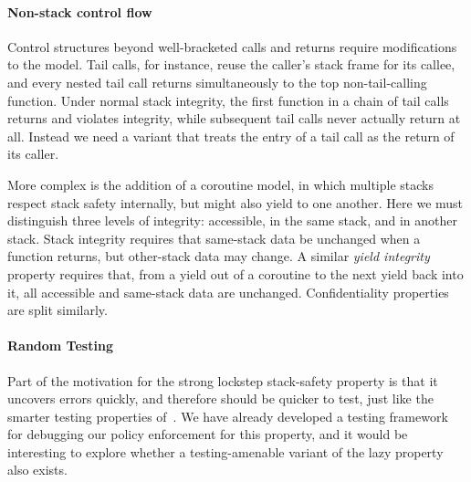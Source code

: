 \documentclass[acmsmall,review,anonymous]{acmart}\settopmatter{printfolios=true,printccs=false,printacmref=false}
\begin{document}
{{  \paragraph{Non-stack control flow}

    Control structures beyond well-bracketed calls and returns require
    modifications to the model. Tail calls, for instance, reuse the caller's
    stack frame for its callee, and every nested tail call returns
    simultaneously to the top non-tail-calling function. Under normal stack
    integrity, the first function in a chain of tail calls returns and violates
    integrity, while subsequent tail calls never actually return at all.
    Instead we need a variant that treats the entry of a tail call as the
    return of its caller.

    More complex is the addition of a coroutine model, in which multiple stacks
    respect stack safety internally, but might also yield to one another.
    Here we must distinguish three levels of integrity: accessible, in the same
    stack, and in another stack. Stack integrity requires that same-stack data
    be unchanged when a function returns, but other-stack data may change. A
    similar {\em yield integrity} property requires that, from a yield out of
    a coroutine to the next yield back into it, all accessible and same-stack
    data are unchanged. Confidentiality properties are split similarly.

  \paragraph{Random Testing}

  Part of the motivation for the strong lockstep stack-safety property
  is that it uncovers errors quickly, and therefore should be quicker
  to test, just like the smarter testing properties
  of~\citet{TestingNI:ICFP}. We have already developed a testing
  framework for debugging our policy enforcement for this property, and
  it would be interesting to explore whether a testing-amenable variant
  of the lazy property also exists.

}}
\end{document}
